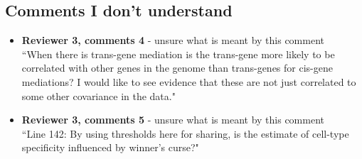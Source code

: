 \documentclass[a4paper,12pt]{article}
\begin{document}
	
	\subsection*{Comments I don't understand}
	\begin{itemize}
		\item \textbf{Reviewer 3, comments 4} - unsure what is meant by this comment\\
		
		``When there is trans-gene mediation is the trans-gene more likely to be correlated with other genes in the genome than trans-genes for cis-gene mediations? I would like to see evidence that these are not just correlated to some other covariance in the data."
		
		\item \textbf{Reviewer 3, comments 5} - unsure what is meant by this comment\\
		
		``Line 142: By using thresholds here for sharing, is the estimate of cell-type specificity influenced by winner’s curse?"
		
		
	\end{itemize}
	
	
	
	
	
	
	
	
	
	
	
	
	
	
	
	
	
	
	
	
	
	
	
	
	
	
	
	
	
	
	
	
	
	
	
	
	
	
	
	
	
	
	
	
	
	
	
\end{document}

